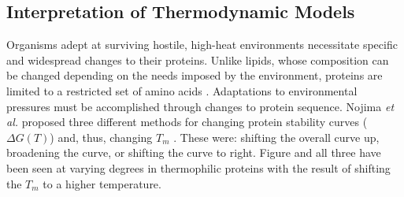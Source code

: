 



\subsection{Interpretation of Thermodynamic Models}

Organisms adept at surviving hostile, high-heat environments necessitate
specific and widespread changes to their proteins.  Unlike lipids, whose
composition can be changed depending on the needs imposed by the environment,
proteins are limited to a restricted set of amino acids
\cite{Razvi_ref_Russell_1990}.  Adaptations to environmental pressures must be
accomplished through changes to protein sequence. Nojima \emph{et al.} proposed
three different methods for changing protein stability curves ($\Delta G \left
(  T \right )$) and, thus, changing ${T}_{m}$ \cite{Razvi_Nojima_1977}.  These
were: shifting the overall curve up, broadening the curve, or shifting the
curve to right.  Figure %
and all three have been seen at varying degrees in thermophilic proteins
with the result of shifting the ${T }_{m }$ to a higher temperature.  

